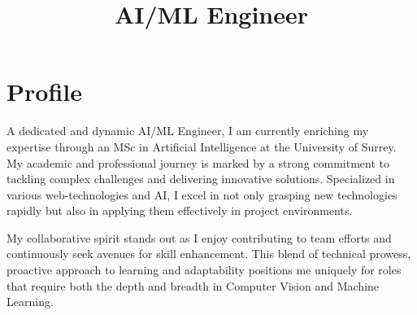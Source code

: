 \documentclass[11pt,a4paper,sans]{moderncv}
\title{AI/ML Engineer}
\begin{document}


% 

\makecvtitle

\section{Profile}


A dedicated and dynamic AI/ML Engineer, I am currently enriching my expertise through an MSc in Artificial Intelligence
at the University of Surrey. My academic and professional journey is marked by a strong commitment to tackling complex
challenges and delivering innovative solutions. Specialized in various web-technologies and AI, I excel in not only
grasping new technologies rapidly but also in applying them effectively in project environments.

My collaborative spirit stands out as I enjoy contributing to team efforts and continuously seek avenues for skill
enhancement. This blend of technical prowess, proactive approach to learning and adaptability positions me
uniquely for roles that require both the depth and breadth in Computer Vision and Machine Learning.
\end{document}
